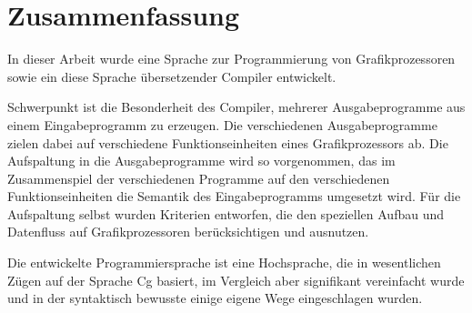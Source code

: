 \documentclass[twoside,a4paper,fleqn,12pt]{book}
\begin{document}
\fancyhead[CLR]{}
\fancyhead[LE,RO]{\footnotesize \thepage{}}
\fancyhead[CE]{\footnotesize \leftmark}
\fancyhead[CO]{\footnotesize \rightmark}
\fancyfoot[C]{}
\renewcommand{\headrulewidth}{0pt}


\thispagestyle{empty}
\newpage
\chapter*{Zusammenfassung}

In dieser Arbeit wurde eine Sprache zur Programmierung von Grafikprozessoren sowie ein diese Sprache übersetzender
Compiler entwickelt.

Schwerpunkt ist die Besonderheit des Compiler, mehrerer Ausgabeprogramme aus einem Eingabeprogramm zu erzeugen.
Die verschiedenen Ausgabeprogramme zielen dabei auf verschiedene Funktionseinheiten
eines Grafikprozessors ab. Die Aufspaltung in die Ausgabeprogramme wird so vorgenommen, das im
Zusammenspiel der verschiedenen Programme auf den verschiedenen Funktionseinheiten die Semantik
des Eingabeprogramms umgesetzt wird. Für die Aufspaltung selbst wurden Kriterien entworfen, die
den speziellen Aufbau und Datenfluss auf Grafikprozessoren berücksichtigen und ausnutzen.

Die entwickelte Programmiersprache ist eine Hochsprache, die in wesentlichen Zügen auf der
Sprache Cg basiert, im Vergleich aber signifikant vereinfacht wurde und in der syntaktisch bewusste einige
eigene Wege eingeschlagen wurden.

\thispagestyle{empty}
\newpage
\mbox{}
\thispagestyle{empty}
\newpage
\tableofcontents

\cleardoublepage
{}
\newcommand\todo[1]{\footnote{\textcolor{red}{TODO: #1}}}
\newcommand\fcite[1]{\footnote{\cite{#1}}}
\newcommand\fciteX[2]{\footnote{\cite{#1}, #2}}

\newcommand\emphalt[1]{\textbf{#1}}

\newcommand\freqPerMesh[1]{\framebox{#1}}
\newcommand\freqPerVert[1]{\colorbox{SpringGreen}{\textcolor{Black}{#1}}}
\newcommand\freqPerFrag[1]{\colorbox{BlueViolet}{\textcolor{White}{#1}}}

\setcounter{secnumdepth}{3}
\end{document}
